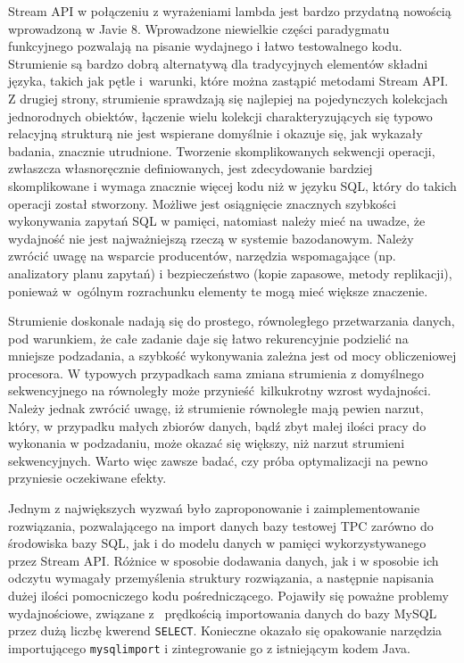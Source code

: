 \documentclass[12pt,twoside,openright]{extarticle}
\begin{document}
    Stream API w połączeniu z wyrażeniami lambda jest bardzo przydatną nowością wprowadzoną w Javie 8. Wprowadzone niewielkie części paradygmatu funkcyjnego pozwalają na pisanie wydajnego i łatwo testowalnego kodu. Strumienie są bardzo dobrą alternatywą dla tradycyjnych elementów składni języka, takich jak pętle i~warunki, które można zastąpić metodami Stream API. Z drugiej strony, strumienie sprawdzają się najlepiej na pojedynczych kolekcjach jednorodnych obiektów, łączenie wielu kolekcji charakteryzujących się typowo relacyjną strukturą nie jest wspierane domyślnie i okazuje się, jak wykazały badania, znacznie utrudnione. Tworzenie skomplikowanych sekwencji operacji, zwłaszcza własnoręcznie definiowanych, jest zdecydowanie bardziej skomplikowane i wymaga znacznie więcej kodu niż w języku SQL, który do takich operacji został stworzony. Możliwe jest osiągnięcie znacznych szybkości wykonywania zapytań SQL w pamięci, natomiast należy mieć na uwadze, że wydajność nie jest najważniejszą rzeczą w systemie bazodanowym. Należy zwrócić uwagę na wsparcie producentów, narzędzia wspomagające (np. analizatory planu zapytań) i bezpieczeństwo (kopie zapasowe, metody replikacji), ponieważ w~ogólnym rozrachunku elementy te mogą mieć większe znaczenie.

    Strumienie doskonale nadają się do prostego, równoległego przetwarzania danych, pod warunkiem, że całe zadanie daje się łatwo rekurencyjnie podzielić na mniejsze podzadania, a szybkość wykonywania zależna jest od mocy obliczeniowej procesora. W typowych przypadkach sama zmiana strumienia z domyślnego sekwencyjnego na równoległy może przynieść kilkukrotny wzrost wydajności. Należy jednak zwrócić uwagę, iż strumienie równoległe mają pewien narzut, który, w przypadku małych zbiorów danych, bądź zbyt małej ilości pracy do wykonania w podzadaniu, może okazać się większy, niż narzut strumieni sekwencyjnych. Warto więc zawsze badać, czy próba optymalizacji na pewno przyniesie oczekiwane efekty.



    Jednym z największych wyzwań było zaproponowanie i zaimplementowanie rozwiązania, pozwalającego na import danych bazy testowej TPC zarówno do środowiska bazy SQL, jak i do modelu danych w pamięci wykorzystywanego przez Stream API. Różnice w sposobie dodawania danych, jak i w sposobie ich odczytu wymagały przemyślenia struktury rozwiązania, a następnie napisania dużej ilości pomocniczego kodu pośredniczącego. Pojawiły się poważne problemy wydajnościowe, związane z~ prędkością importowania danych do bazy MySQL przez dużą liczbę kwerend \texttt{SELECT}. Konieczne okazało się opakowanie narzędzia importującego \texttt{mysqlimport} i zintegrowanie go z istniejącym kodem Java.
\end{document}

